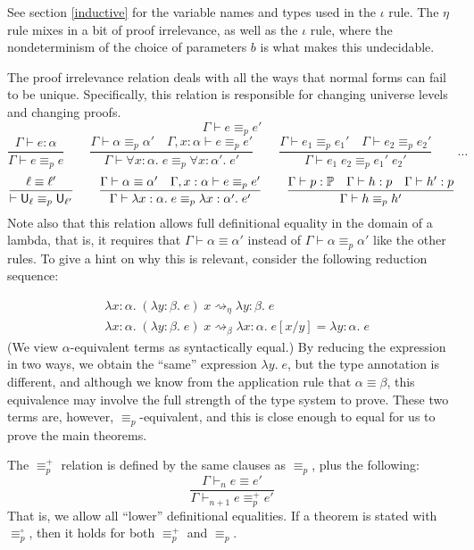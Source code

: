 See section \ref{inductive} for the variable names and types used in the $\iota$ rule. The $\eta$ rule mixes in a bit of proof irrelevance, as well as the $\iota$ rule, where the nondeterminism of the choice of parameters $b$ is what makes this undecidable.

The proof irrelevance relation deals with all the ways that normal forms can fail to be unique. Specifically, this relation is responsible for changing universe levels and changing proofs.
$$\boxed{\Gamma\vdash e\equiv_p e'}$$
$$\frac{\Gamma\vdash e:\alpha}{\Gamma\vdash e\equiv_p e}\qquad
\frac{\Gamma\vdash\alpha\equiv_p\alpha'\quad \Gamma,x:\alpha\vdash e\equiv_p e'}{\Gamma\vdash \forall x:\alpha.\;e\equiv_p \forall x:\alpha'.\;e'}\qquad
\frac{\Gamma\vdash e_1\equiv_p e_1'\quad \Gamma\vdash e_2\equiv_p e_2'}{\Gamma\vdash e_1\;e_2\equiv_p e_1'\;e_2'}\qquad\dots$$
$$\frac{\ell\equiv\ell'}{\vdash \U_\ell\equiv_p\U_{\ell'}}\qquad
\frac{\Gamma\vdash\alpha\equiv\alpha'\quad \Gamma,x:\alpha\vdash e\equiv_p e'}{\Gamma\vdash \lambda x:\alpha.\;e\equiv_p \lambda x:\alpha'.\;e'}\qquad
\frac{\Gamma\vdash p:\P\quad \Gamma\vdash h:p\quad \Gamma\vdash h':p}{\Gamma \vdash h\equiv_p h'}$$
Note also that this relation allows full definitional equality in the domain of a lambda, that is, it requires that $\Gamma\vdash \alpha\equiv\alpha'$ instead of $\Gamma\vdash \alpha\equiv_p\alpha'$ like the other rules. To give a hint on why this is relevant, consider the following reduction sequence:

\begin{align*}
&\lambda x:\alpha.\;(\lambda y:\beta.\;e)\;x\rightsquigarrow_\eta\lambda y:\beta.\;e\\
&\lambda x:\alpha.\;(\lambda y:\beta.\;e)\;x\rightsquigarrow_\beta\lambda x:\alpha.\;e[x/y]=\lambda y:\alpha.\;e
\end{align*}
(We view $\alpha$-equivalent terms as syntactically equal.) By reducing the expression in two ways, we obtain the ``same'' expression $\lambda y.\;e$, but the type annotation is different, and although we know from the application rule that $\alpha\equiv\beta$, this equivalence may involve the full strength of the type system to prove. These two terms are, however, $\equiv_p$-equivalent, and this is close enough to equal for us to prove the main theorems.

The $\equiv_p^+$ relation is defined by the same clauses as $\equiv_p$, plus the following:
$$\frac{\Gamma\vdash_n e\equiv e'}{\Gamma\vdash_{n+1} e\equiv_p^+ e'}$$
That is, we allow all ``lower'' definitional equalities. If a theorem is stated with $\equiv_p^\circ$, then it holds for both $\equiv_p^+$ and $\equiv_p$.

